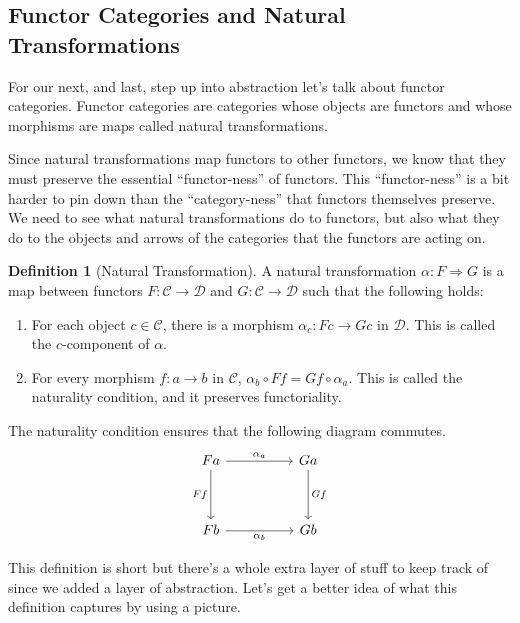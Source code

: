 \documentclass[12pt]{article}
\theoremstyle{definition}
\newtheorem{definition}{Definition}
\begin{document}
\subsection*{Functor Categories and Natural Transformations}
For our next, and last, step up into abstraction let's talk about functor categories.
Functor categories are categories whose objects are functors and whose morphisms are maps called natural transformations.

Since natural transformations map functors to other functors, we know that they must preserve the essential ``functor-ness'' of functors.
This ``functor-ness'' is a bit harder to pin down than the ``category-ness'' that functors themselves preserve.
We need to see what natural transformations do to functors, but also what they do to the objects and arrows of the categories that the functors are acting on.

\begin{definition}[Natural Transformation]
    A natural transformation $\alpha :F\Rightarrow G$ is a map between functors $F:\mathcal{C}\rightarrow\mathcal{D}$ and $G:\mathcal{C}\rightarrow\mathcal{D}$ such that the following holds:
    \begin{enumerate}
        \item For each object $c\in\mathcal{C}$, there is a morphism $\alpha_c:Fc\rightarrow Gc$ in $\mathcal{D}$.
              This is called the $c$-component of $\alpha$.
        \item For every morphism $f:a\rightarrow b$ in $\mathcal{C}$, $\alpha_b\circ Ff=Gf\circ\alpha_a$.
              This is called the naturality condition, and it preserves functoriality.
    \end{enumerate}

    The naturality condition ensures that the following diagram commutes.
    \[\begin{tikzcd}
            Fa && Ga \\
            \\
            Fb && Gb
            \arrow["{\alpha_b}"', from=3-1, to=3-3]
            \arrow["Gf", from=1-3, to=3-3]
            \arrow["Ff"', from=1-1, to=3-1]
            \arrow["{\alpha_a}", from=1-1, to=1-3]
        \end{tikzcd}\]

\end{definition}

This definition is short but there's a whole extra layer of stuff to keep track of since we added a layer of abstraction.
Let's get a better idea of what this definition captures by using a picture.\\
\end{document}
